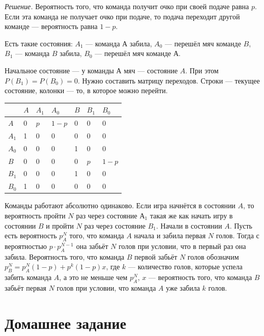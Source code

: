 \textit{Решение.} Вероятность того, что команда получит очко при своей подаче равна $p$.
Если эта команда не получает очко при подаче, то подача переходит другой команде --- вероятность равна $1 - p$.

Есть такие состояния: $A_1$ --- команда $А$ забила, $A_0$ --- перешёл мяч команде $B$, $B_1$ --- команда $B$ забила, $B_0$ --- перешёл мяч команде $А$.

Начальное состояние --- у команды $А$ мяч --- состояние $A$.
При этом $P \left( B_1 \right) = P \left( B_0 \right) = 0$.
Нужно составить матрицу переходов.
Строки --- текущее состояние, колонки --- то, в которое можно перейти.

\begin{center}
    \begin{tabular}{| l | l | l | l | l | l | l |}
    \hline
    & $A$ & $A_1$ & $A_0$ & $B$ & $B_1$ & $B_0$ \\ \hline
    $A$ & 0 & $p$ & $1 - p$ & 0 & 0 & 0 \\ \hline
    $A_1$ & 1 & 0 & 0 & 0 & 0 & 0 \\ \hline
    $A_0$ & 0 & 0 & 0 & 1 & 0 & 0 \\ \hline
    $B$ & 0 & 0 & 0 & 0 & $p$ & $1 - p$ \\ \hline
    $B_1$ & 0 & 0 & 0 & 1 & 0 & 0 \\ \hline
    $B_0$ & 1 & 0 & 0 & 0 & 0 & 0 \\ \hline
    \end{tabular}
\end{center}

Команды работают абсолютно одинаково.
Если игра начнётся в состоянии $A$,
то вероятность пройти $N$ раз через состояние $А_1$ такая же как начать игру в состоянии $B$ и пройти $N$ раз через состояние $B_1$.
Начали в состоянии $A$.
Пусть есть вероятность $p_A^N$ того, что команда $A$ начала и забила первая $N$ голов.
Тогда с вероятностью $p \cdot p_A^{N-1}$ она забьёт $N$ голов при условии, что в первый раз она забила.
Вероятность того, что команда $B$ первой забьёт $N$ голов обозначим $p_B^N = p_A^N \left( 1-p \right) + p^k \left( 1-p \right) x$,
где $k$ --- количество голов, которые успела забить команда $A$, а это не меньше чем $p_A^N$, $x$ --- вероятность того, что команда $B$ забьёт первая $N$ голов при условии, что команда $A$ уже забила $k$ голов.

\section*{Домашнее задание}

